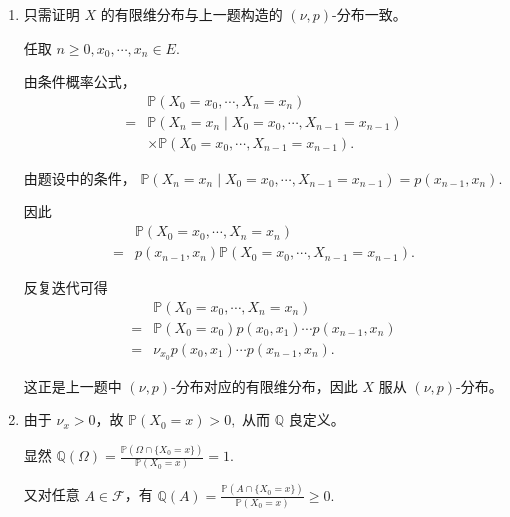 \documentclass{ctexart}
\begin{document}
\begin{solution}
  \begin{enumerate}
    \item 只需证明 \(X\) 的有限维分布与上一题构造的 \((\nu,p)\)-分布一致。

      任取
      \( n \geq 0, x_0,\cdots,x_n \in E. \)

      由条件概率公式，
      \begin{align*}
        &\mathbb{P}(X_0=x_0,\cdots,X_n=x_n)
        \\
        ={}&
        \mathbb{P}(X_n=x_n \mid X_0=x_0,\cdots,X_{n-1}=x_{n-1})
        \\
        & \times
        \mathbb{P}(X_0=x_0,\cdots,X_{n-1}=x_{n-1}).
      \end{align*}

      由题设中的条件，
      \( \mathbb{P}(X_n=x_n \mid X_0=x_0,\cdots,X_{n-1}=x_{n-1}) = p(x_{n-1},x_n). \)

      因此
      \begin{align*}
        &\mathbb{P}(X_0=x_0,\cdots,X_n=x_n)
        \\
        ={}&
        p(x_{n-1},x_n)
        \mathbb{P}(X_0=x_0,\cdots,X_{n-1}=x_{n-1}).
      \end{align*}

      反复迭代可得
      \begin{align*}
        &\mathbb{P}(X_0=x_0,\cdots,X_n=x_n)
        \\
        ={}&
        \mathbb{P}(X_0=x_0)
        p(x_0,x_1)\cdots p(x_{n-1},x_n)
        \\
        ={}&
        \nu_{x_0}
        p(x_0,x_1)\cdots p(x_{n-1},x_n).
      \end{align*}

      这正是上一题中 \((\nu,p)\)-分布对应的有限维分布，因此 \(X\) 服从 \((\nu,p)\)-分布。

    \item 由于 \(\nu_x > 0\)，故 \( \mathbb{P}(X_0=x) > 0, \) 从而 \(\mathbb{Q}\) 良定义。

      显然
      \( \mathbb{Q}(\Omega) = \frac{\mathbb{P}(\Omega \cap \{X_0=x\})}{\mathbb{P}(X_0=x)} = 1. \)

      又对任意 \(A \in \mathcal{F}\)，有
      \( \mathbb{Q}(A) = \frac{\mathbb{P}(A \cap \{X_0=x\})}{\mathbb{P}(X_0=x)} \geq 0. \)


\end{enumerate}
\end{solution}
\end{document}
